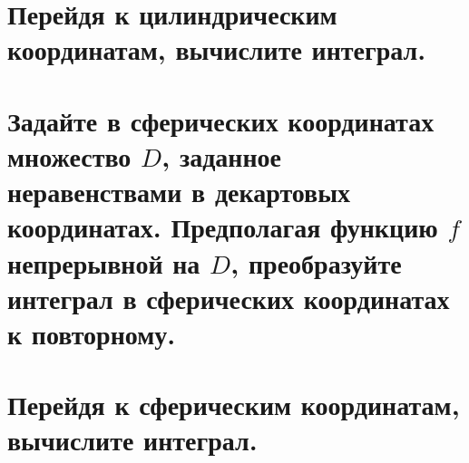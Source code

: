 \documentclass[a4paper, fleqn]{article}
\begin{document}
    
    \section*{Перейдя к цилиндрическим координатам, вычислите интеграл.}
    
    
    \section*{Задайте в сферических координатах множество $D$, заданное неравенствами в декартовых координатах.
    Предполагая функцию $f$ непрерывной на $D$, преобразуйте интеграл в сферических координатах к повторному.}
    
    
    \section*{Перейдя к сферическим координатам, вычислите интеграл.}
    
    
\end{document}
